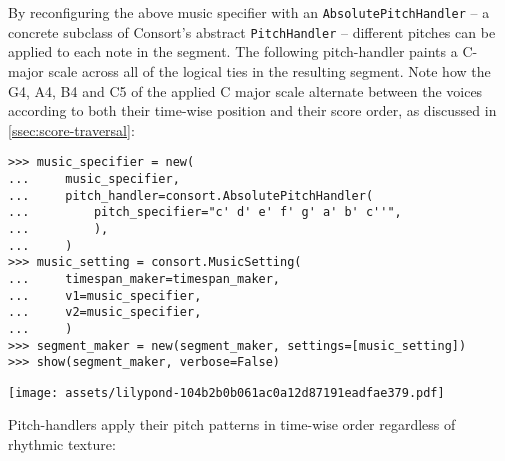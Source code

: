 \noindent By reconfiguring the above music specifier with an
\texttt{AbsolutePitchHandler} -- a concrete subclass of Consort's abstract
\texttt{PitchHandler} -- different pitches can be applied to each note in the
segment. The following pitch-handler paints a C-major scale across all of the
logical ties in the resulting segment. Note how the G4, A4, B4 and C5 of the
applied C major scale alternate between the voices according to both their
time-wise position and their score order, as discussed in
\autoref{ssec:score-traversal}:

\begin{comment}
<abjad>[stylesheet=../consort.ily]
music_specifier = new(
    music_specifier,
    pitch_handler=consort.AbsolutePitchHandler(
        pitch_specifier="c' d' e' f' g' a' b' c''",
        ),
    )
music_setting = consort.MusicSetting(
    timespan_maker=timespan_maker,
    v1=music_specifier,
    v2=music_specifier,
    )
segment_maker = new(segment_maker, settings=[music_setting])
show(segment_maker, verbose=False)
</abjad>
\end{comment}

\begin{abjadbookoutput}
\begin{singlespacing}
\vspace{-0.5\baselineskip}
\begin{lstlisting}
>>> music_specifier = new(
...     music_specifier,
...     pitch_handler=consort.AbsolutePitchHandler(
...         pitch_specifier="c' d' e' f' g' a' b' c''",
...         ),
...     )
>>> music_setting = consort.MusicSetting(
...     timespan_maker=timespan_maker,
...     v1=music_specifier,
...     v2=music_specifier,
...     )
>>> segment_maker = new(segment_maker, settings=[music_setting])
>>> show(segment_maker, verbose=False)
\end{lstlisting}
\noindent\texttt{[image: assets/lilypond-104b2b0b061ac0a12d87191eadfae379.pdf]}
\end{singlespacing}
\end{abjadbookoutput}

\noindent Pitch-handlers apply their pitch patterns in time-wise order
regardless of rhythmic texture:

\begin{comment}
<abjad>[stylesheet=../consort.ily]
music_specifier = new(
    music_specifier,
    rhythm_maker__talea__counts=[1, 2, 3, 4],
    )
music_setting = consort.MusicSetting(
    timespan_maker=timespan_maker,
    v1=music_specifier,
    v2=music_specifier,
    )
segment_maker = new(segment_maker, settings=[music_setting])
show(segment_maker, verbose=False)
</abjad>
\end{comment}

